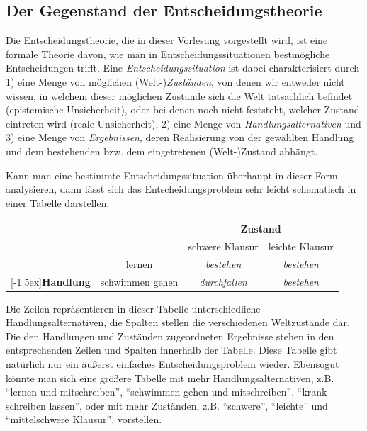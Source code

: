 \subsection{Der Gegenstand der Entscheidungstheorie}

Die Entscheidungstheorie, die in dieser Vorlesung vorgestellt wird,
ist eine
formale Theorie davon, wie man in Entscheidungssituationen
bestmögliche Entscheidungen trifft. Eine {\em Entscheidungssituation}
ist dabei charakterisiert durch 1) eine Menge von möglichen
(Welt-){\em Zuständen}, von denen wir entweder nicht wissen, in
welchem dieser möglichen Zustände sich die Welt tatsächlich befindet
(epistemische Unsicherheit), oder bei denen noch nicht feststeht,
welcher Zustand eintreten wird (reale Unsicherheit), 2) eine Menge von
{\em Handlungsalternativen} und 3) eine Menge von {\em Ergebnissen},
deren Realisierung von der gewählten Handlung und dem bestehenden
bzw. dem eingetretenen (Welt-)Zustand abhängt.

Kann man eine bestimmte Entscheidungssituation überhaupt in dieser Form
analysieren, dann lässt sich das Entscheidungsproblem sehr leicht schematisch
in einer Tabelle darstellen: 

\begin{center}
\begin{tabular}{cc|c|c|}
& \multicolumn{1}{c}{} & \multicolumn{2}{c}{{\bf Zustand}} \\
&                  & schwere Klausur   & leichte Klausur    \\ \cline{2-4}
& lernen           & {\em bestehen}    &  {\em bestehen}    \\ \cline{2-4}
\raisebox{1.5ex}[-1.5ex]{{\bf Handlung}} 
& schwimmen gehen  & {\em durchfallen} &  {\em bestehen} \\
\cline{2-4}
\end{tabular}
\end{center}

Die Zeilen repräsentieren in dieser Tabelle unterschiedliche
Handlungs\-alternativ\-en, die Spalten stellen die verschiedenen
Weltzustände dar. Die den Handlungen und Zuständen zugeordneten
Ergebnisse stehen in den entsprechenden Zeilen und Spalten innerhalb
der Tabelle. Diese Tabelle gibt natürlich nur ein äußerst einfaches
Entscheidungsproblem wieder. Ebensogut könnte man sich eine größere
Tabelle mit mehr Handlungsalternativen, z.B. "`lernen und
mitschreiben"', "`schwimmen gehen und mitschreiben"', "`krank
schreiben lassen"', oder mit mehr Zuständen, z.B. "`schwere"',
"`leichte"' und "`mittelschwere Klausur"', vorstellen.
 
